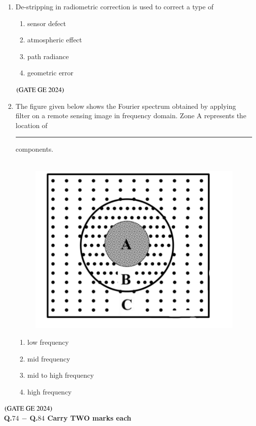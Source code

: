 \documentclass[journal,12pt,onecolumn]{IEEEtran}
\theoremstyle{remark}
\begin{document}
\begin{enumerate}
\item De-stripping in radiometric correction is used to correct a type of
\begin{enumerate}
\item sensor defect
\item atmospheric effect
\item path radiance
\item geometric error
\end{enumerate}
\hfill $\brak{\text{GATE GE 2024}}$
\bigskip
\item The figure given below shows the Fourier spectrum obtained by applying filter on a remote sensing image in frequency domain.
Zone A represents the location of \rule{2cm}{0.5mm} components. \\
\\
\begin{figure}[H]
    \centering
    \includegraphics[width=0.2\columnwidth]{figs/fig10.png}
    \caption{}
    \label{figs:fig10}
\end{figure}

\begin{enumerate}
\item low frequency
\item mid frequency
\item mid to high frequency
\item high frequency
\end{enumerate}

\end{enumerate}
\hfill $\brak{\text{GATE GE 2024}}$
\bigskip
\\
\textbf{Q.$74$ $-$ Q.$84$ Carry TWO marks each}
\\
\end{document}

